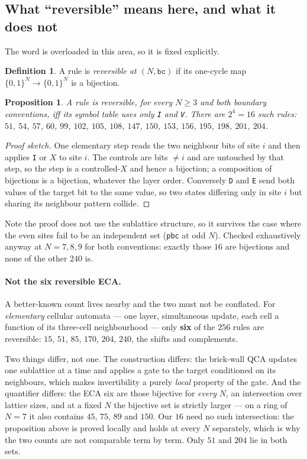\documentclass[11pt]{article}
\newcommand{\rt}[1]{\texttt{#1}}
\theoremstyle{plain}
\newtheorem{proposition}{Proposition}
\theoremstyle{definition}
\newtheorem{definition}{Definition}
\begin{document}
\subsection{What ``reversible'' means here, and what it does not}
\label{sec:reversible-def}

The word is overloaded in this area, so it is fixed explicitly.

\begin{definition}
A rule is \emph{reversible at $(N,\rt{bc})$} if its one-cycle map
$\{0,1\}^N\to\{0,1\}^N$ is a bijection.
\end{definition}

\begin{proposition}
A rule is reversible, for every $N\ge3$ and both boundary conventions, iff its
symbol table uses only \rt{I} and \rt{V}. There are $2^4=16$ such rules:
$51$, $54$, $57$, $60$, $99$, $102$, $105$, $108$, $147$, $150$, $153$, $156$,
$195$, $198$, $201$, $204$.
\end{proposition}

\begin{proof}[Proof sketch]
One elementary step reads the two neighbour bits of site $i$ and then applies
\rt{I} or $X$ to site $i$. The controls are bits $\neq i$ and are untouched by
that step, so the step is a controlled-$X$ and hence a bijection; a composition of
bijections is a bijection, whatever the layer order. Conversely \rt{D} and \rt{E}
send both values of the target bit to the same value, so two states differing only
in site $i$ but sharing its neighbour pattern collide.
\end{proof}

\noindent Note the proof does not use the sublattice structure, so it survives the
case where the even sites fail to be an independent set (\rt{pbc} at odd $N$).
Checked exhaustively anyway at $N=7,8,9$ for both conventions: exactly those $16$
are bijections and none of the other $240$ is.

\paragraph{Not the six reversible ECA.} A better-known count lives nearby and the
two must not be conflated. For \emph{elementary} cellular automata --- one layer,
simultaneous update, each cell a function of its three-cell neighbourhood ---
only \textbf{six} of the $256$ rules are reversible: $15$, $51$, $85$, $170$,
$204$, $240$, the shifts and complements.

Two things differ, not one. The construction differs: the brick-wall QCA updates
one sublattice at a time and applies a gate to the target conditioned on its
neighbours, which makes invertibility a purely \emph{local} property of the gate.
And the quantifier differs: the ECA six are those bijective for \emph{every} $N$,
an intersection over lattice sizes, and at a fixed $N$ the bijective set is
strictly larger --- on a ring of $N=7$ it also contains $45$, $75$, $89$ and
$150$. Our $16$ need no such intersection: the proposition above is proved
locally and holds at every $N$ separately, which is why the two counts are not
comparable term by term. Only $51$ and $204$ lie in both sets.
\end{document}
